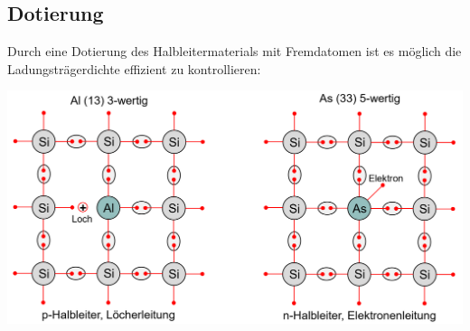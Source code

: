 \begin{multicols}{2}
\begin{minipage}{\linewidth}
    \subsection{Dotierung}
   Durch eine Dotierung des Halbleitermaterials mit Fremdatomen ist es möglich die Ladungsträgerdichte effizient zu kontrollieren:
\end{minipage}
\includegraphics[width=0.8\linewidth]{images/SiAsDotierung}
\end{multicols}

